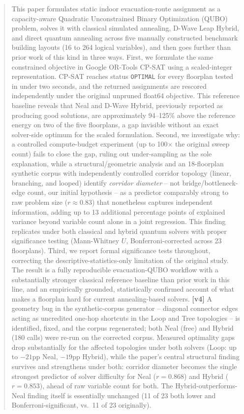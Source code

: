 \documentclass[11pt]{article}
\begin{document}
\begin{abstract}
This paper formulates static indoor evacuation-route assignment as a capacity-aware Quadratic Unconstrained Binary Optimization (QUBO) problem, solves it with classical simulated annealing, D-Wave Leap Hybrid, and direct quantum annealing across five manually constructed benchmark building layouts (16 to 264 logical variables), and then goes further than prior work of this kind in three ways. First, we formulate the same constrained objective in Google OR-Tools CP-SAT using a scaled-integer representation. CP-SAT reaches status \texttt{OPTIMAL} for every floorplan tested in under two seconds, and the returned assignments are rescored independently under the original unpruned float64 objective. This reference baseline reveals that Neal and D-Wave Hybrid, previously reported as producing good solutions, are approximately 94--125\% above the reference energy on two of the five floorplans, a gap invisible without an exact solver-side optimum for the scaled formulation. Second, we investigate why: a controlled compute-budget experiment (up to 100$\times$ the original sweep count) fails to close the gap, ruling out under-sampling as the sole explanation, while a structural/geometric analysis and an 18-floorplan synthetic corpus with independently controlled corridor topology (linear, branching, and looped) identify \emph{corridor diameter} -- not bridge/bottleneck-edge count, our initial hypothesis -- as a predictor comparably strong to raw problem size ($r\approx0.83$) that nonetheless captures independent information, adding up to 13 additional percentage points of explained variance beyond variable count alone in a joint regression. This finding replicates under both classical and hybrid quantum solvers with proper significance testing (Mann-Whitney $U$, Bonferroni-corrected across 23 floorplans). Third, we report formal significance tests throughout, correcting the descriptive-statistics-only limitation of the original study. The result is a fully reproducible evacuation-QUBO workflow with a substantially stronger classical reference baseline than prior work in this line, and an empirically grounded, statistically confirmed account of what makes a floorplan hard for current annealing-based solvers. \textbf{[v4]} A geometry bug in the synthetic-corpus generator -- diagonal connector edges acting as uncredited one-hop shortcuts in the Loop and Tree topologies -- is identified, fixed, and the corpus regenerated; both Neal (free) and Hybrid (180 calls) were re-run on the corrected corpus. Measured optimality gaps drop substantially for the affected topologies under both solvers (Loop: up to $-21$pp Neal, $-19$pp Hybrid), while the paper's central structural finding survives and strengthens under both: corridor diameter becomes the single strongest predictor of solver difficulty for Neal ($r=0.868$) and Hybrid ($r=0.853$), ahead of raw variable count for both. The Hybrid-outperforms-Neal finding itself is essentially unchanged (11 of 23 both lower and Bonferroni-significant, vs.\ 11 of 23 originally).
\end{abstract}
\end{document}
